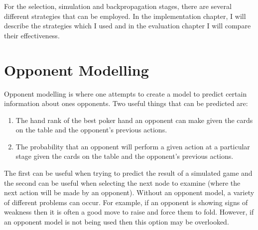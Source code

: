For the selection, simulation and backpropagation stages, there are several different strategies that can be employed. In the implementation chapter, I will describe the strategies which I used and in the evaluation chapter I will compare their effectiveness. 



\section{Opponent Modelling}					%


Opponent modelling is where one attempts to create a model to predict certain information about ones opponents. Two useful things that can be predicted are:
\begin{enumerate}
\item The hand rank of the best poker hand an opponent can make given the cards on the table and the opponent's previous actions.
\item The probability that an opponent will perform a given action at a particular stage given the cards on the table and the opponent's previous actions.
\end{enumerate}

The first can be useful when trying to predict the result of a simulated game and the second can be useful when selecting the next node to examine (where the next action will be made by an opponent). Without an opponent model, a variety of different problems can occur. For example, if an opponent is showing signs of weakness then it is often a good move to raise and force them to fold. However, if an opponent model is not being used then this option may be overlooked.





